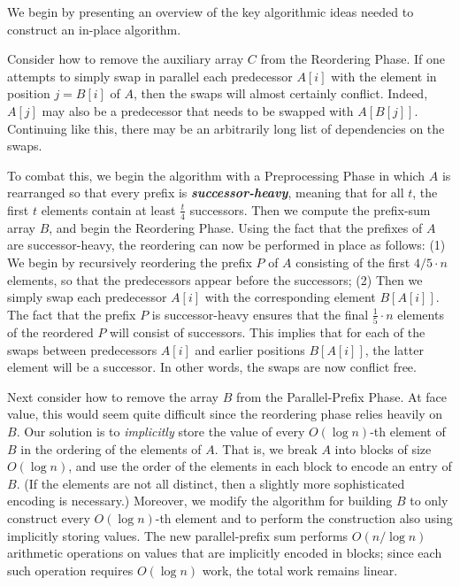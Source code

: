 \documentclass[sigplan, twocolumn]{amsart}
\newcommand{\defn}[1]       {{\textit{\textbf{\boldmath #1}}}}
\renewcommand{\paragraph}[1]{\vspace{0.09in}\noindent{\bf \boldmath #1.}}
\theoremstyle{remark}
\theoremstyle{remark}
\begin{document}
\paragraph{Algorithm Outline}
We begin by presenting an overview of the key algorithmic ideas needed
to construct an in-place algorithm.

Consider how to remove the auxiliary array $C$ from the Reordering
Phase. If one attempts to simply swap in parallel each predecessor
$A[i]$ with the element in position $j = B[i]$ of $A$, then the swaps
will almost certainly conflict. Indeed, $A[j]$ may also be a
predecessor that needs to be swapped with $A[B[j]]$. Continuing like
this, there may be an arbitrarily long list of dependencies on the
swaps.

To combat this, we begin the algorithm with a Preprocessing Phase in
which $A$ is rearranged so that every prefix is
\defn{successor-heavy}, meaning that for all $t$, the first $t$ elements contain at
least $\frac{t}{4}$ successors. Then we compute the
prefix-sum array $B$, and begin the Reordering Phase. Using the
fact that the prefixes of $A$ are successor-heavy, the reordering can
now be performed in place as follows: (1) We begin by recursively
reordering the prefix $P$ of $A$ consisting of the first $4/5 \cdot n$
elements, so that the predecessors appear before the successors; (2)
Then we simply swap each predecessor $A[i]$ with the corresponding
element $B[A[i]]$. The fact that the prefix $P$ is successor-heavy
ensures that the final $\frac{1}{5} \cdot n$ elements of the reordered
$P$ will consist of successors. This implies that for each of the
swaps between predecessors $A[i]$ and earlier positions $B[A[i]]$, the
latter element will be a successor. In other words, the swaps are now
conflict free.

Next consider how to remove the array $B$ from the Parallel-Prefix
Phase. At face value, this would seem quite difficult since the
reordering phase relies heavily on $B$. Our solution is to
\emph{implicitly} store the value of every $O(\log n)$-th element of
$B$ in the ordering of the elements of $A$. That is, we break $A$ into
blocks of size $O(\log n)$, and use the order of the elements in each
block to encode an entry of $B$. (If the elements are not all
  distinct, then a slightly more sophisticated encoding is necessary.)
Moreover, we modify the algorithm for building $B$ to only construct
every $O(\log n)$-th element and to perform the construction also
using implicitly storing values. The new parallel-prefix sum performs
$O(n / \log n)$ arithmetic operations on values that are implicitly
encoded in blocks; since each such operation requires $O(\log n)$
work, the total work remains linear.
\end{document}
